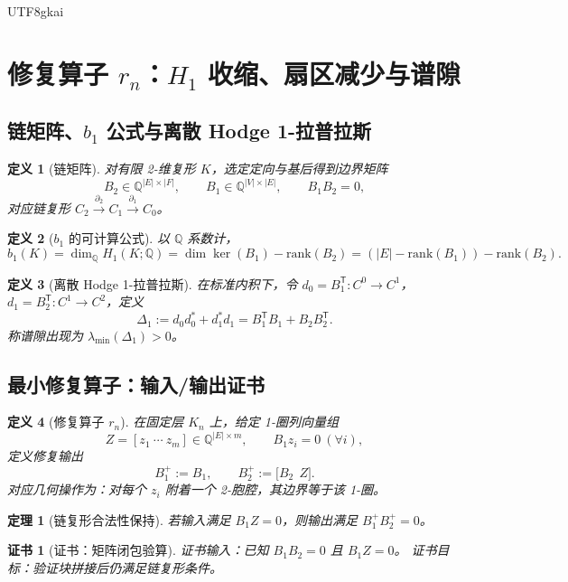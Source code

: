 \documentclass[12pt]{article}
\newtheorem{definition}{定义}[section]
\newtheorem{theorem}{定理}[section]
\newtheorem{Certificate}{证书}[section]
\newcommand{\QQ}{\mathbb{Q}}
\begin{document}
\begin{CJK*}{UTF8}{gkai}
\clearpage
\section{修复算子 $r_n$：$H_1$ 收缩、扇区减少与谱隙}
\label{sec:rn}

\subsection{链矩阵、$b_1$ 公式与离散 Hodge 1-拉普拉斯}

\begin{definition}[链矩阵]
\label{def:D15}
对有限 2-维复形 $K$，选定定向与基后得到边界矩阵
\[
B_2\in\QQ^{|E|\times |F|},\qquad B_1\in\QQ^{|V|\times |E|},
\qquad B_1B_2=0,
\]
对应链复形 $C_2\xrightarrow{\partial_2}C_1\xrightarrow{\partial_1}C_0$。
\end{definition}

\begin{definition}[$b_1$ 的可计算公式]
\label{def:D16}
以 $\QQ$ 系数计，
\[
b_1(K)=\dim_{\QQ}H_1(K;\QQ)
=\dim\ker(B_1)-\mathrm{rank}(B_2)
=(|E|-\mathrm{rank}(B_1))-\mathrm{rank}(B_2).
\]
\end{definition}

\begin{definition}[离散 Hodge 1-拉普拉斯]
\label{def:D17}
在标准内积下，令 $d_0=B_1^{\mathsf T}:C^0\to C^1$，$d_1=B_2^{\mathsf T}:C^1\to C^2$，定义
\[
\Delta_1:=d_0d_0^\ast+d_1^\ast d_1
= B_1^{\mathsf T}B_1 + B_2B_2^{\mathsf T}.
\]
称\emph{谱隙出现}为 $\lambda_{\min}(\Delta_1)>0$。
\end{definition}

\subsection{最小修复算子：输入/输出证书}

\begin{definition}[修复算子 $r_n$]
\label{def:D18}
在固定层 $K_n$ 上，给定 1-圈列向量组
\[
Z=[z_1\ \cdots\ z_m]\in\QQ^{|E|\times m},
\qquad B_1z_i=0\ (\forall i),
\]
定义修复输出
\[
B_1^+:=B_1,\qquad B_2^+:=\big[B_2\ \ Z\big].
\]
对应几何操作为：对每个 $z_i$ 附着一个 2-胞腔，其边界等于该 1-圈。
\end{definition}

\begin{theorem}[链复形合法性保持]
\label{thm:T7}
若输入满足 $B_1Z=0$，则输出满足 $B_1^+B_2^+=0$。
\end{theorem}

\begin{Certificate}[证书：矩阵闭包验算]
\label{cert:T7}
证书输入：已知 $B_1B_2=0$ 且 $B_1Z=0$。
证书目标：验证块拼接后仍满足链复形条件。
\end{Certificate}


\end{CJK*}
\end{document}
